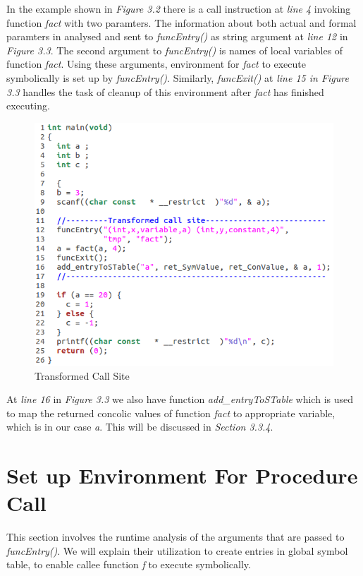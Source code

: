 \documentclass[12pt,oneside]{book}
\begin{document}
In the example shown in \textit{Figure 3.2} there is a call instruction at \textit{line 4} invoking function \textit{fact} with two paramters. The information about both actual and formal paramters in analysed and sent to \textit{funcEntry()} as string argument at \textit{line 12} in \textit{Figure 3.3}. The second argument to \textit{funcEntry()} is names of local variables of function \textit{fact}. Using these arguments, environment for \textit{fact} to execute symbolically is set up by \textit{funcEntry()}. Similarly, \textit{funcExit()} at \textit{line 15 in Figure 3.3} handles the task of cleanup of this environment after \textit{fact} has finished executing.

\vspace{0.4cm}
\begin{figure}[htbp]
\centering
\includegraphics[scale=0.56]{env2_modified.png}
\caption{Transformed Call Site}
\end{figure}  

At \textit{line 16} in \textit{Figure 3.3} we also have function \textit{add\_entryToSTable} which is used to map the returned concolic values of function \textit{fact} to appropriate variable, which is in our case \textit{a}. This will be discussed in \textit{Section 3.3.4}. 

\newpage

\section{Set up Environment For Procedure Call}
This section involves the runtime analysis of the arguments that are passed to \textit{funcEntry()}. We will explain their utilization to create entries in global symbol table, to enable callee function \textit{f} to execute symbolically.
\end{document}
